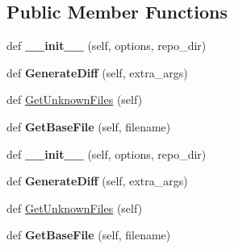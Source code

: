 \subsection*{Public Member Functions}
\begin{DoxyCompactItemize}
\item 
def {\bfseries \+\_\+\+\_\+init\+\_\+\+\_\+} (self, options, repo\+\_\+dir)\hypertarget{classupload_1_1MercurialVCS_a33890f442dedbb7d9fd45c08b5baed56}{}\label{classupload_1_1MercurialVCS_a33890f442dedbb7d9fd45c08b5baed56}

\item 
def {\bfseries Generate\+Diff} (self, extra\+\_\+args)\hypertarget{classupload_1_1MercurialVCS_a6c05746012d8cd435c94ace1465671ef}{}\label{classupload_1_1MercurialVCS_a6c05746012d8cd435c94ace1465671ef}

\item 
def \hyperlink{classupload_1_1MercurialVCS_a6190899fb86cd09ad84cc5d4b0ebd2f3}{Get\+Unknown\+Files} (self)
\item 
def {\bfseries Get\+Base\+File} (self, filename)\hypertarget{classupload_1_1MercurialVCS_a0cdc0cbe6ac4daab82f5f01e6ae2e670}{}\label{classupload_1_1MercurialVCS_a0cdc0cbe6ac4daab82f5f01e6ae2e670}

\item 
def {\bfseries \+\_\+\+\_\+init\+\_\+\+\_\+} (self, options, repo\+\_\+dir)\hypertarget{classupload_1_1MercurialVCS_a33890f442dedbb7d9fd45c08b5baed56}{}\label{classupload_1_1MercurialVCS_a33890f442dedbb7d9fd45c08b5baed56}

\item 
def {\bfseries Generate\+Diff} (self, extra\+\_\+args)\hypertarget{classupload_1_1MercurialVCS_a6c05746012d8cd435c94ace1465671ef}{}\label{classupload_1_1MercurialVCS_a6c05746012d8cd435c94ace1465671ef}

\item 
def \hyperlink{classupload_1_1MercurialVCS_a6190899fb86cd09ad84cc5d4b0ebd2f3}{Get\+Unknown\+Files} (self)
\item 
def {\bfseries Get\+Base\+File} (self, filename)\hypertarget{classupload_1_1MercurialVCS_a0cdc0cbe6ac4daab82f5f01e6ae2e670}{}\label{classupload_1_1MercurialVCS_a0cdc0cbe6ac4daab82f5f01e6ae2e670}

\end{DoxyCompactItemize}
